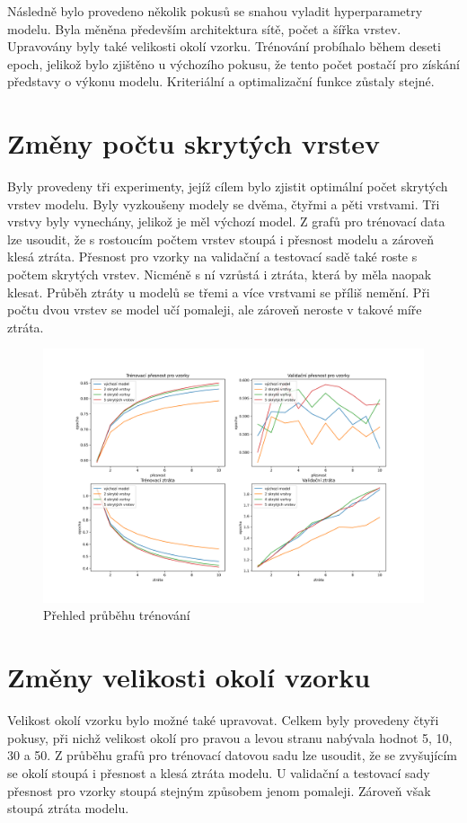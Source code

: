 \documentclass[FM,BP]{tulthesis}
\begin{document}
Následně bylo provedeno několik pokusů se snahou vyladit hyperparametry modelu. Byla měněna především architektura sítě, počet a šířka vrstev. Upravovány byly také velikosti okolí vzorku. Trénování probíhalo během deseti epoch, jelikož bylo zjištěno u výchozího pokusu, že tento počet postačí pro získání představy o výkonu modelu. Kriteriální a optimalizační funkce zůstaly stejné.

\section{Změny počtu skrytých vrstev} %
Byly provedeny tři experimenty, jejíž cílem bylo zjistit optimální počet skrytých vrstev modelu. Byly vyzkoušeny modely se dvěma, čtyřmi a pěti vrstvami. Tři vrstvy byly vynechány, jelikož je měl výchozí model. Z grafů pro trénovací data lze usoudit, že s rostoucím počtem vrstev stoupá i přesnost modelu a zároveň klesá ztráta. Přesnost pro vzorky na validační a testovací sadě také roste s počtem skrytých vrstev. Nicméně s ní vzrůstá i ztráta, která by měla naopak klesat. Průběh ztráty u modelů se třemi a více vrstvami se příliš nemění. Při počtu dvou vrstev se model učí pomaleji, ale zároveň neroste v takové míře ztráta.

\begin{figure}[!htbp]
\centerline{\includegraphics[scale=.5]{training_course-layers.png}}
\caption{Přehled průběhu trénování}
\label{fig}
\end{figure}
\FloatBarrier

\section{Změny velikosti okolí vzorku} %
Velikost okolí vzorku bylo možné také upravovat. Celkem byly provedeny čtyři pokusy, při nichž velikost okolí pro pravou a levou stranu nabývala hodnot 5, 10, 30 a 50. Z průběhu grafů pro trénovací datovou sadu lze usoudit, že se zvyšujícím se okolí stoupá i přesnost a klesá ztráta modelu. U validační a testovací sady přesnost pro vzorky stoupá stejným způsobem jenom pomaleji. Zároveň však stoupá ztráta modelu.
\end{document}

